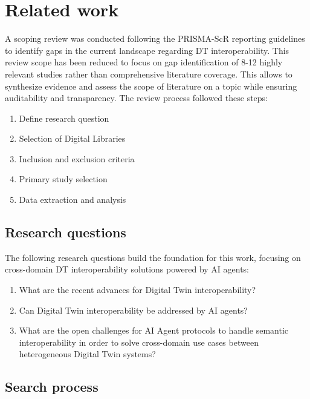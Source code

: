\chapter{Related work}
\label{chap:related-work}

A scoping review was conducted following the PRISMA-ScR reporting guidelines~\cite{tricco2018}
    to identify gaps in the current landscape regarding DT interoperability.
This review scope has been reduced to focus on gap identification of 8-12 highly relevant studies
    rather than comprehensive literature coverage.
This allows to synthesize evidence and assess the scope of literature on a topic while ensuring
    auditability and transparency.
The review process followed these steps:

\begin{enumerate}
    \item Define research question
    \item Selection of Digital Libraries
    \item Inclusion and exclusion criteria
    \item Primary study selection
    \item Data extraction and analysis
\end{enumerate}

\section{Research questions}

The following research questions build the foundation for this work, focusing on
    cross-domain DT interoperability solutions powered by AI agents:

\begin{enumerate}[label=RQ\arabic*:]
    \item \label{rq:digital-twin} What are the recent advances for Digital Twin interoperability?
    \item \label{rq:ai-agents} Can Digital Twin interoperability be addressed by AI agents?
    \item \label{rq:cross-domain} What are the open challenges for
        AI Agent protocols to handle semantic interoperability in order to solve
        cross-domain use cases between heterogeneous Digital Twin systems?
\end{enumerate}

\section{Search process}

